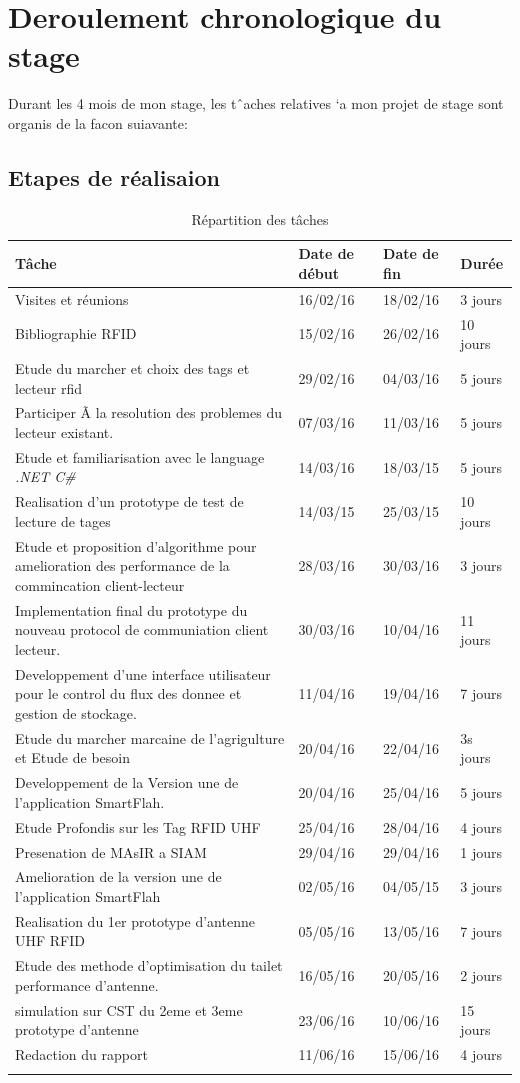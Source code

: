 \documentclass[11pt, a4paper, twoside]{book}
\begin{document}
\section{Deroulement chronologique du stage}
Durant les 4 mois de mon stage, les tˆaches relatives `a mon projet de stage sont organis de la facon suiavante:
\subsection{Etapes	de	réalisaion}
\begin{longtable}{|p{}|p{}|p{}| p{}|}
\hline
\textbf{Tâche} & \textbf{Date de début} & \textbf{Date de fin} & \textbf{Durée} \\
\hline
Visites et réunions & 16/02/16 & 18/02/16 & 3 jours \\
\hline
Bibliographie RFID & 15/02/16 & 26/02/16 & 10 jours \\
\hline
Etude du marcher et choix des tags et lecteur rfid & 29/02/16 & 04/03/16 & 5 jours \\
\hline
Participer Ã  la resolution des problemes du lecteur existant.
 & 07/03/16 & 11/03/16 & 5 jours \\
\hline
Etude et familiarisation avec le language \emph{.NET C\#} & 14/03/16 & 18/03/15 & 5 jours \\
\hline
Realisation d'un prototype de test de lecture de tages & 14/03/15 & 25/03/15 & 10 jours \\
\hline
 Etude et proposition d'algorithme pour amelioration des performance de la commincation client-lecteur
 & 28/03/16 & 30/03/16 & 3 jours \\
\hline
Implementation final du prototype du nouveau protocol de communiation client lecteur.
 & 30/03/16 & 10/04/16 & 11 jours \\
\hline
Developpement d'une interface utilisateur pour le control du flux des donnee et gestion de stockage.
 & 11/04/16 & 19/04/16 & 7 jours \\
\hline
Etude du marcher marcaine de l'agrigulture et Etude de besoin & 20/04/16 & 22/04/16 & 3s jours \\
\hline
Developpement de la Version une de l'application SmartFlah. & 20/04/16 & 25/04/16 & 5 jours \\
\hline
Etude Profondis sur les Tag RFID UHF  & 25/04/16 & 28/04/16 & 4 jours \\
\hline
Presenation de MAsIR a SIAM  & 29/04/16 & 29/04/16 & 1 jours \\
\hline
Amelioration de la version une de l'application SmartFlah & 02/05/16 & 04/05/15 & 3 jours \\
\hline
Realisation du 1er prototype d'antenne UHF RFID & 05/05/16 & 13/05/16 & 7 jours \\
\hline
Etude des methode d'optimisation du tailet performance d'antenne. & 16/05/16 & 20/05/16 & 2 jours \\
\hline
simulation sur CST du 2eme et 3eme prototype d'antenne & 23/06/16 & 10/06/16 & 15 jours \\
\hline
Redaction du rapport & 11/06/16 & 15/06/16 & 4 jours \\
\hline
\caption{Répartition des tâches}
\end{longtable}
\end{document}
